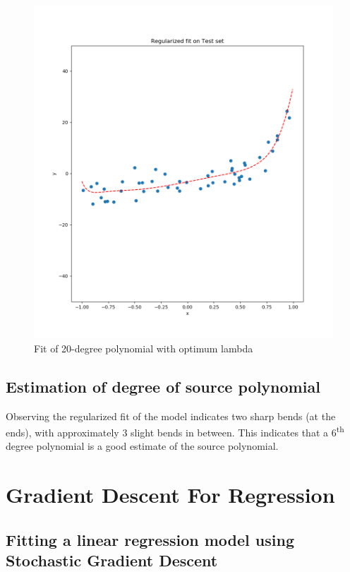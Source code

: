 \documentclass[paper=a4, fontsize=11pt]{scrartcl} %
\numberwithin{equation}{section} %
\numberwithin{figure}{section} %
\numberwithin{table}{section} %
\begin{document}
\begin{figure}[H]
    \includegraphics[width=\linewidth]{q1p15.png}
    \caption{Fit of 20-degree polynomial with optimum lambda}
    \label{fig:q1p15}
\end{figure}

\subsection{Estimation of degree of source polynomial}

Observing the regularized fit of the model indicates two sharp bends (at the ends), with approximately 3 slight bends in between. This indicates that a 6\textsuperscript{th} degree polynomial is a good estimate of the source polynomial.


\section{Gradient Descent For Regression}
\subsection{Fitting a linear regression model using Stochastic Gradient Descent}
\end{document}
